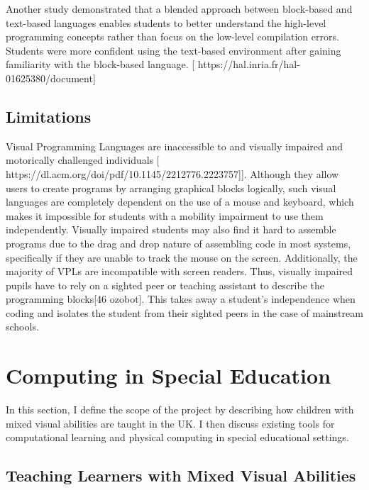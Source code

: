 \documentclass[oneside,%
                    author={Malak Hajji},
                    degree={BSc},
                    title={Designing An Accessible Computational Toolkit For Students},
                  subtitle={With Mixed Visual Abilities}]{dissertation}
\begin{document}
Another study demonstrated that a blended approach between block-based and text-based languages enables students to better understand the high-level programming concepts rather than focus on the low-level compilation errors. Students were more confident using the text-based environment after gaining familiarity with the block-based language. [ https://hal.inria.fr/hal-01625380/document]
 
\subsection{Limitations}

Visual Programming Languages are inaccessible to and visually impaired and motorically challenged individuals [ https://dl.acm.org/doi/pdf/10.1145/2212776.2223757]]. Although they allow users to create programs by arranging graphical blocks logically, such visual languages are completely dependent on the use of a mouse and keyboard, which makes it impossible for students with a mobility impairment to use them independently. Visually impaired students may also find it hard to assemble programs due to the drag and drop nature of assembling code in most systems, specifically if they are unable to track the mouse on the screen.  Additionally, the majority of VPLs are incompatible with screen readers. Thus, visually impaired pupils have to rely on a sighted peer or teaching assistant to describe the programming blocks[46 ozobot]. This takes away a student’s independence when coding and isolates the student from their sighted peers in the case of mainstream schools.


\section{Computing in Special Education}
In this section, I define the scope of the project by describing how children with mixed visual abilities are taught in the UK.  I then discuss existing tools for computational learning and physical computing in special educational settings. 

\subsection{Teaching Learners with Mixed Visual Abilities}
\end{document}
